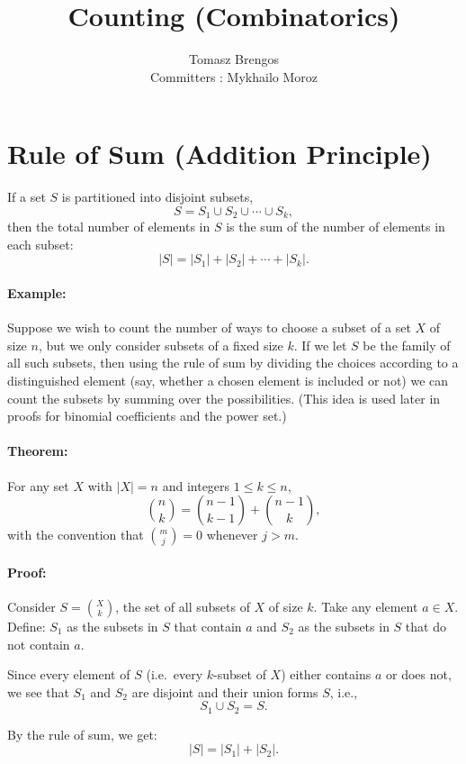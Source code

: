 \documentclass[docmute]{article}
\title{Counting (Combinatorics)}
\author{Tomasz Brengos \\  
Committers : Mykhailo Moroz}
\begin{document}
\maketitle

\section{Rule of Sum (Addition Principle)}
If a set $S$ is partitioned into disjoint subsets,
\[
S = S_1 \cup S_2 \cup \cdots \cup S_k,
\]
then the total number of elements in $S$ is the sum of the number of elements in each subset:
\[
|S| = |S_1| + |S_2| + \cdots + |S_k|.
\]

\paragraph{Example:}  
Suppose we wish to count the number of ways to choose a subset of a set $X$ of size $n$, but we only consider subsets of a fixed size $k$. If we let $S$ be the family of all such subsets, then using the rule of sum by dividing the choices according to a distinguished element (say, whether a chosen element is included or not) we can count the subsets by summing over the possibilities. (This idea is used later in proofs for binomial coefficients and the power set.)

\paragraph{Theorem:}
For any set \( X \) with \( |X| = n \) and integers \( 1 \le k \le n \),
\[
\binom{n}{k} = \binom{n-1}{k-1} + \binom{n-1}{k},
\]
with the convention that \( \binom{m}{j} = 0 \) whenever \( j > m \).

\paragraph{Proof:}
Consider \( S = \binom{X}{k} \), the set of all subsets of \( X \) of size \( k \).  
Take any element \( a \in X \). Define:  
 \( S_1 \) as the subsets in \( S \) that contain \( a \) and  
 \( S_2 \) as the subsets in \( S \) that do not contain \( a \).  

Since every element of \( S \) (i.e.\ every $k$-subset of $X$) either contains \( a \) or does not, we see that \( S_1 \) and \( S_2 \) are disjoint and their union forms \( S \), i.e.,  
\[
S_1 \cup S_2 = S.
\]

By the rule of sum, we get:  
\[
|S| = |S_1| + |S_2|.
\]
\end{document}
